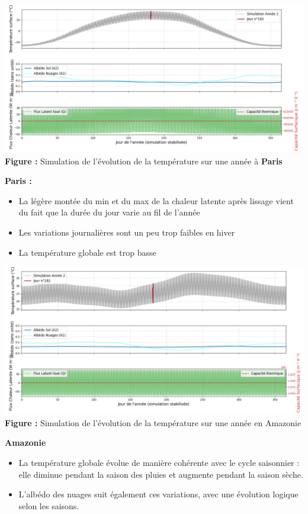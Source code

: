 \documentclass[a4paper,12pt]{article}
\begin{document}
\begin{center}
  \includegraphics[width=1\linewidth]{modele4/figures/paris.png}
  \textbf{Figure :} Simulation de l'évolution de la température sur une année à \textbf{Paris}
\end{center}
\textbf{Paris :}
\begin{itemize}
    \item 	La légère montée du min et du max de la chaleur latente après lissage vient  du fait que la durée du jour varie au fil de l’année 
    \item Les variations journalières sont un peu trop faibles en hiver
    \item La température globale est trop basse
\end{itemize}

  
\begin{center}
  \includegraphics[width=1\linewidth]{modele4/figures/amzonie.png}
  \textbf{Figure :} Simulation de l'évolution de la température sur une année en Amazonie
  \end{center}
  \textbf{Amazonie}
\begin{itemize}
    \item La température globale évolue de manière cohérente avec le cycle saisonnier : elle diminue pendant la saison des pluies et augmente pendant la saison sèche.
    \item L’albédo des nuages suit également ces variations, avec une évolution logique selon les saisons.
\end{itemize}
\end{document}
